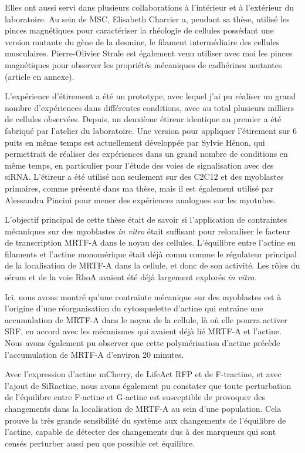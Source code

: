 Elles ont aussi servi dans plusieurs collaborations à l'intérieur et à l'extérieur du laboratoire. Au sein de MSC, Elisabeth Charrier a, pendant sa thèse, utilisé les pinces magnétiques pour caractériser la rhéologie de cellules possédant une version mutante du gène de la desmine, le filament intermédiaire des cellules musculaires. Pierre-Olivier Strale est également venu utiliser avec moi les pinces magnétiques pour observer les propriétés mécaniques de cadhérines mutantes (article en annexe). 

L'expérience d'étirement a été un prototype, avec lequel j'ai pu réaliser un grand nombre d'expériences dans différentes conditions, avec au total plusieurs milliers de cellules observées. Depuis, un deuxième étireur identique au premier a été fabriqué par l'atelier du laboratoire. Une version pour appliquer l'étirement sur 6 puits en même temps est actuellement développée par Sylvie Hénon, qui permettrait de réaliser des expériences dans un grand nombre de conditions en même temps, en particulier pour l'étude des voies de signalisation avec des siRNA. 
L'étireur a été utilisé non seulement sur des C2C12 et des myoblastes primaires, comme présenté dans ma thèse, mais il est également utilisé par Alessandra Pincini pour mener des expériences analogues sur les myotubes. 

L'objectif principal de cette thèse était de savoir si l'application de contraintes mécaniques sur des myoblastes \textit{in vitro} était suffisant pour relocaliser le facteur de transcription MRTF-A dans le noyau des cellules. L'équilibre entre l'actine en filaments et l'actine monomérique était déjà connu comme le régulateur principal de la localisation de MRTF-A dans la cellule, et donc de son activité. Les rôles du sérum et de la voie RhoA avaient été déjà largement explorés \textit{in vitro}. 

Ici, nous avons montré qu'une contrainte mécanique sur des myoblastes est à l'origine d'une réorganisation du cytosquelette d'actine qui entraîne une accumulation de MRTF-A dans le noyau de la cellule, là où elle pourra activer SRF, en accord avec les mécanismes qui avaient déjà lié MRTF-A et l'actine. 
Nous avons également pu observer que cette polymérisation d'actine précède l'accumulation de MRTF-A d'environ 20 minutes. 

Avec l'expression d'actine mCherry, de LifeAct RFP et de F-tractine, et avec l'ajout de SiRactine, nous avons également pu constater que toute perturbation de l'équilibre entre F-actine et G-actine est susceptible de provoquer des changements dans la localisation de MRTF-A au sein d'une population. Cela prouve la très grande sensibilité du système aux changements de l'équilibre de l'actine, capable de détecter des changements dus à des marqueurs qui sont censés perturber aussi peu que possible cet équilibre. 

